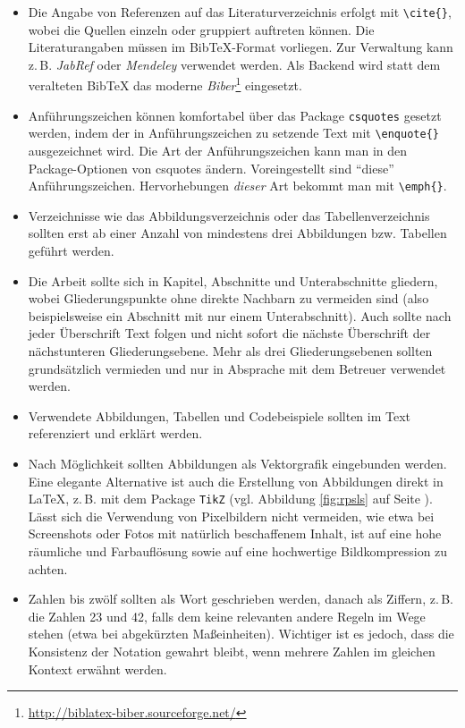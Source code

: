 \begin{itemize}
	\item Die Angabe von Referenzen auf das Literaturverzeichnis erfolgt mit \texttt{\textbackslash{}cite\{\}}, wobei die Quellen einzeln \cite{knuth.literate84} oder gruppiert \cite{knuth.literate84,nm.epinjava,lamportlatex} auftreten können. Die Literaturangaben müssen im Bib\TeX{}-Format vorliegen. Zur Verwaltung kann z.\,B. \emph{JabRef} oder \emph{Mendeley} verwendet werden. Als Backend wird statt dem veralteten Bib\TeX{} das moderne \emph{Biber}\footnote{\url{http://biblatex-biber.sourceforge.net/}} eingesetzt.
	\item Anführungszeichen können komfortabel über das Package \texttt{csquotes} gesetzt werden, indem der in Anführungszeichen zu setzende Text mit \texttt{\textbackslash{}enquote\{\}} ausgezeichnet wird. Die Art der Anführungszeichen kann man in den Package-Optionen von csquotes ändern. Voreingestellt sind \enquote{diese} Anführungszeichen. Hervorhebungen \emph{dieser} Art bekommt man mit \texttt{\textbackslash{}emph\{\}}.
	\item Verzeichnisse wie das Abbildungsverzeichnis oder das Tabellenverzeichnis sollten erst ab einer Anzahl von mindestens drei Abbildungen bzw. Tabellen geführt werden.
	\item Die Arbeit sollte sich in Kapitel, Abschnitte und Unterabschnitte gliedern, wobei Gliederungspunkte ohne direkte Nachbarn zu vermeiden sind (also beispielsweise ein Abschnitt mit nur einem Unterabschnitt). Auch sollte nach jeder Überschrift Text folgen und nicht sofort die nächste Überschrift der nächstunteren Gliederungsebene. Mehr als drei Gliederungsebenen sollten grundsätzlich vermieden und nur in Absprache mit dem Betreuer verwendet werden.
	\item Verwendete Abbildungen, Tabellen und Codebeispiele sollten im Text referenziert und erklärt werden.
	\item Nach Möglichkeit sollten Abbildungen als Vektorgrafik eingebunden werden. Eine elegante Alternative ist auch die Erstellung von Abbildungen direkt in \LaTeX, z.\,B. mit dem Package \texttt{TikZ} (vgl. Abbildung \ref{fig:rpsls} auf Seite \pageref{fig:rpsls}). Lässt sich die Verwendung von Pixelbildern nicht vermeiden, wie etwa bei Screenshots oder Fotos mit natürlich beschaffenem Inhalt, ist auf eine hohe räumliche und Farbauflösung sowie auf eine hochwertige Bildkompression zu achten.
	\item Zahlen bis zwölf sollten als Wort geschrieben werden, danach als Ziffern, z.\,B. die Zahlen 23 und 42, falls dem keine relevanten andere Regeln im Wege stehen (etwa bei abgekürzten Maßeinheiten). Wichtiger ist es jedoch, dass die Konsistenz der Notation gewahrt bleibt, wenn mehrere Zahlen im gleichen Kontext erwähnt werden.

\end{itemize}
